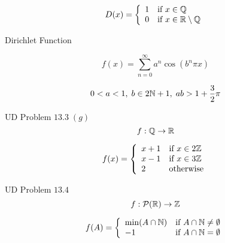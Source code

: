 \begin{frame}{}
  \[
    D(x) = \left\{\begin{array}{ll}
      1 & \text{if } x \in \mathbb{Q} \\
      0 & \text{if } x \in \mathbb{R} \setminus \mathbb{Q} 
    \end{array}\right.
  \]

  \vspace{0.60cm}
  \centerline{Dirichlet Function}
\end{frame}

\begin{frame}{}

  \[
    f(x)=\sum_{n=0} ^\infty a^n \cos(b^n \pi x) 
  \]

  \[
    0 < a < 1,\; b \in 2\mathbb{N} + 1,\; ab > 1+\frac{3}{2} \pi
  \]
\end{frame}

\begin{frame}{}
  \begin{exampleblock}{UD Problem $13.3\; (g)$}
    \[
      f: \mathbb{Q} \to \mathbb{R}{}
    \]

    \[
      f(x) = \left\{\begin{array}{ll}
	x + 1 & \text{if } x \in 2\mathbb{Z}{} \\
	x - 1 & \text{if } x \in 3\mathbb{Z}{} \\
	2     & \text{otherwise}
      \end{array}\right.
    \]
  \end{exampleblock}
\end{frame}

\begin{frame}{}
  \begin{exampleblock}{UD Problem $13.4$}
    \[
      f: \mathcal{P}(\mathbb{R}{}) \to \mathbb{Z}{}
    \]

    \[
      f(A) = \left\{\begin{array}{ll}
	\min(A \cap \mathbb{N}{}) & \text{if } A \cap \mathbb{N}{} \neq \emptyset \\
	-1 & \text{if } A \cap \mathbb{N}{} = \emptyset
      \end{array}\right.
    \]
  \end{exampleblock}
\end{frame}

